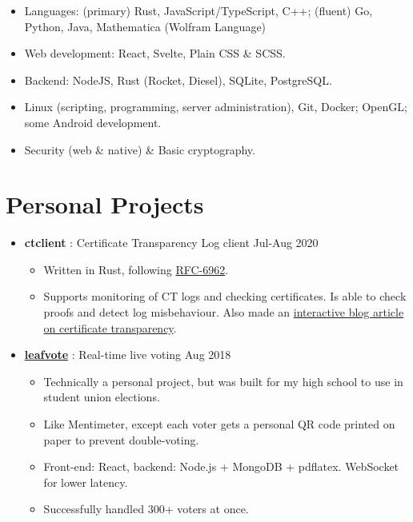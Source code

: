   \begin{itemize}[itemsep=0.1\parskip]
    \item Languages: (primary) Rust, JavaScript/TypeScript, C++; (fluent) Go, Python, Java, Mathematica (Wolfram Language)

    \item Web development: React, Svelte, Plain CSS \& SCSS.

    \item Backend: NodeJS, Rust (Rocket, Diesel), SQLite, PostgreSQL.

    \item Linux (scripting, programming, server administration), Git, Docker; OpenGL; some Android development.

    \item Security (web \& native) \& Basic cryptography.
  \end{itemize}

  \section{Personal Projects}

  \begin{itemize}

    \item \textbf{ctclient} : Certificate Transparency Log client \dashdiv{} Jul-Aug 2020

    \begin{itemize}
      \item Written in Rust, following \href{https://tools.ietf.org/html/rfc6962}{\color{link}RFC-6962}.
      \item Supports monitoring of CT logs and checking certificates. Is able to check proofs and detect log misbehaviour. Also made an \href{https://blog.maowtm.org/ct/en.html}{\color{link}interactive blog article on certificate transparency}.
    \end{itemize}

    \item \href{https://leafvote.mww.moe}{\color{link}\textbf{leafvote}} : Real-time live voting \dashdiv{} Aug 2018

    \begin{itemize}
      \item Technically a personal project, but was built for my high school to use in student union elections.
      \item Like Mentimeter, except each voter gets a personal QR code printed on paper to prevent double-voting.
      \item Front-end: React, backend: Node.js + MongoDB + pdflatex. WebSocket for lower latency.
      \item Successfully handled 300+ voters at once.
    \end{itemize}

  \end{itemize}


